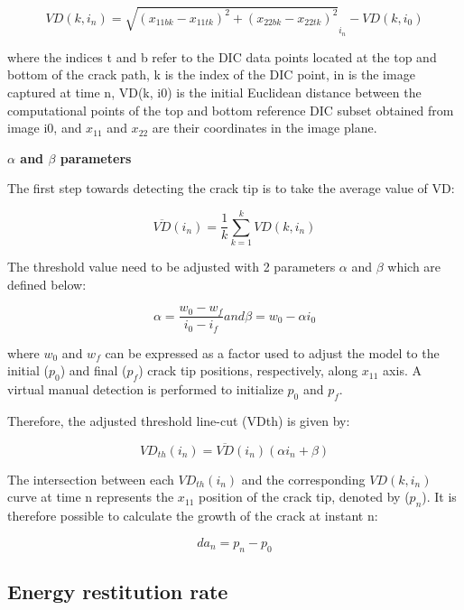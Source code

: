 \begin{equation}
	VD(k,i_n)=\sqrt{(x_{11bk}-x_{11tk})^2 + (x_{22bk}-x_{22tk})^2}_{i_n} - VD(k,i_0)
\end{equation}

where the indices t and b refer to the DIC data points located at the top and bottom of the crack path, k is the index of the DIC point, in is the image captured at time n, VD(k, i0) is the initial Euclidean distance between the computational points of the top and bottom reference DIC subset obtained from image i0, and $x_{11}$ and $x_{22}$ are their coordinates in the image plane.

\textbf{$\alpha$ and $\beta$ parameters}

The first step towards detecting the crack tip is to take the average value of VD:

\begin{equation}
	\overline{VD}(i_n)=\frac{1}{k} \sum_{k=1}^{k}VD(k,i_n)
\end{equation}

The threshold value need to be adjusted with 2 parameters $\alpha$ and $\beta$ which are defined below:

\begin{equation}
	\alpha=\frac{w_0 - w_f}{i_0 - i_f}  and \beta=w_0- \alpha i_0
\end{equation}

where $w_0$ and $w_f$ can be expressed as a factor used to adjust the model to the initial ($p_0$) and final ($p_f$) crack tip positions, respectively, along $x_{11}$ axis. A virtual manual detection is performed to initialize $p_0$ and $p_f$.

Therefore, the adjusted threshold line-cut (VDth) is given by:

\begin{equation}
	VD_{th}(i_n)=\overline{VD}(i_n)(\alpha i_n +\beta)
\end{equation}

The intersection between each $VD_{th}(i_n)$ and the corresponding $VD(k, i_n)$ curve at time n represents the $x_{11}$ position of the crack tip, denoted by ($p_n$).
It is therefore possible to calculate the growth of the crack at instant n:

\begin{equation}
	da_n=p_n-p_0
\end{equation}

\subsection{Energy restitution rate}

